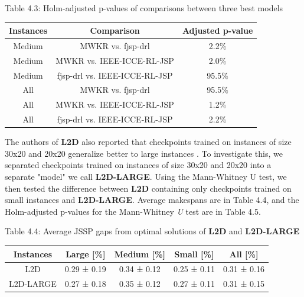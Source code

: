 \begin{table}
    Table 4.3: Holm-adjusted p-values of comparisons between three best models\\
    \vspace{1mm}
    \label{table:4.3}
    \begin{tabular}{ccc}
        \toprule
        Instances & Comparison & Adjusted p-value \\
        \midrule
        Medium & MWKR vs. fjsp-drl & 2.2$\%$ \\
        Medium & MWKR vs. IEEE-ICCE-RL-JSP & 2.0$\%$ \\
        Medium & fjsp-drl vs. IEEE-ICCE-RL-JSP & 95.5$\%$ \\\hline
        All & MWKR vs. fjsp-drl & 95.5$\%$ \\
        All & MWKR vs. IEEE-ICCE-RL-JSP & 1.2$\%$ \\
        All & fjsp-drl vs. IEEE-ICCE-RL-JSP & 2.2$\%$ \\
        \bottomrule
    \end{tabular}
\end{table}


The authors of \textbf{L2D} also reported that checkpoints trained on instances of size 30x20 and 20x20 generalize better to large instances \cite{zhang2020learning}. To investigate this, we separated checkpoints trained on instances of size 30x20 and 20x20 into a separate "model" we call \textbf{L2D-LARGE}. Using the Mann-Whitney U test, we then tested the difference between \textbf{L2D} containing only checkpoints trained on small instances and \textbf{L2D-LARGE}. Average makespans are in Table 4.4, and the Holm-adjusted p-values for the Mann-Whitney \textit{U} test are in Table 4.5.

\begin{table}
    Table 4.4: Average JSSP gaps from optimal solutions of \textbf{L2D} and \textbf{L2D-LARGE}\\
    \vspace{1mm}
\begin{tabular}{ccccc}
    \toprule
    Instances & Large [\%] & Medium [\%] & Small [\%] & All [\%] \\
    \midrule
    L2D & 0.29 ± 0.19 & 0.34 ± 0.12 & 0.25 ± 0.11 & 0.31 ± 0.16 \\
    L2D-LARGE & 0.27 ± 0.18 & 0.35 ± 0.12 & 0.27 ± 0.11 & 0.31 ± 0.15 \\
    \bottomrule
    \end{tabular}
\end{table}

